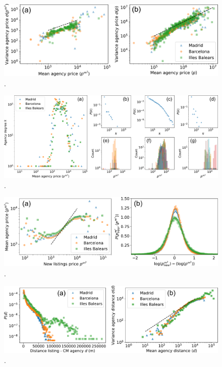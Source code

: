\begin{figure}
    \label{fig:sigma_price}
    \centering
    \includegraphics[width =\textwidth]{Figs/Idealista_dynamics/labeled_sigma_price.pdf}
	\caption[.]{ . }
\end{figure}

\begin{figure}
    \label{fig:panel_price}
    \centering
    \includegraphics[width =\textwidth]{Figs/Idealista_dynamics/panel_price.pdf}
	\caption[.]{ . }
\end{figure}

\begin{figure}
    \label{fig:attach_price}
    \centering
    \includegraphics[width =\textwidth]{Figs/Idealista_dynamics/panel_attach_price.pdf}
	\caption[.]{ . }
\end{figure}

\begin{figure}
    \label{fig:distance_panel}
    \centering
    \includegraphics[width =\textwidth]{Figs/Idealista_dynamics/distance_panel.pdf}
	\caption[.]{ . }
\end{figure}

